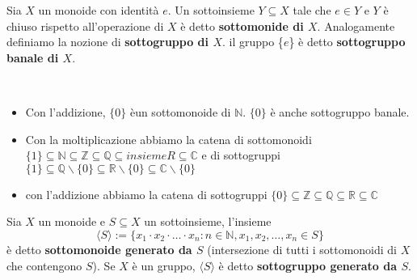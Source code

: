 \documentclass[../main.tex]{subfiles}
\begin{document}
\begin{definition}
    Sia $X$ un monoide con identità $e$.
    Un sottoinsieme $Y \subseteq X$ tale che $e \in Y$ e $Y$ è chiuso rispetto all'operazione di $X$ è detto \textbf{sottomonide di $X$}.
    Analogamente definiamo la nozione di \textbf{sottogruppo di $X$}.
    il gruppo \{$e$\} è detto \textbf{sottogruppo banale di $X$}.
\end{definition}

\begin{example}
    \
    \begin{itemize}
        \item Con l'addizione, $\{0\}$ èun sottomonoide di $\mathbb{N}$. $\{0\}$ è anche sottogruppo banale.
        \item Con la moltiplicazione abbiamo la catena di sottomonoidi $\{1\} \subseteq \mathbb{N} \subseteq
                  \mathbb{Z} \subseteq \mathbb{Q} \subseteq insieme R \subseteq  \mathbb{C}$ e di sottogruppi $\{1\}
                  \subseteq \mathbb{Q}\backslash \{0\} \subseteq \mathbb{R} \backslash \{0\} \subseteq \mathbb{C}
                  \backslash \{0\}$
        \item con l'addizione abbiamo la catena di sottogruppi $\{0\} \subseteq \mathbb{Z} \subseteq \mathbb{Q}
                  \subseteq \mathbb{R} \subseteq \mathbb{C}$
    \end{itemize}
\end{example}

\begin{definition}
    Sia $X$ un monoide e $S \subseteq X$ un sottoinsieme, l'insieme
    \begin{equation*}
        \langle S \rangle := \{ x_1 \cdot x_2 \cdot \ldots \cdot x_n : n \in \mathbb{N}, x_1,x_2,\ldots,x_n \in S \}
    \end{equation*}
    è detto \textbf{sottomonoide generato da $S$} (intersezione di tutti i sottomonoidi di $X$ che contengono $S$).
    Se $X$ è un gruppo, $\langle S \rangle$ è detto \textbf{sottogruppo generato da $S$}.
\end{definition}
\end{document}
